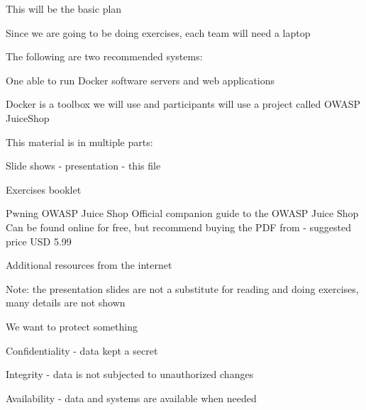 \documentclass[Screen16to9,17pt]{foils}
\begin{document}
\vskip 1cm
This will be the basic plan



Since we are going to be doing exercises, each team will need a laptop

The following are two recommended systems:
\begin{list2}
\item One able to run Docker software servers and web applications
\end{list2}

Docker is a toolbox we will use and participants will use a project called OWASP JuiceShop




\begin{list1}
\item This material is in multiple parts:
\begin{list2}
\item Slide shows - presentation - this file
\item Exercises booklet
\item Pwning OWASP Juice Shop Official companion guide to the OWASP Juice Shop
Can be found online for free, but recommend buying the PDF from  - suggested price USD 5.99

\end{list2}
\item Additional resources from the internet
\item Note: the presentation slides are not a substitute for reading and doing exercises, many details are not shown
\end{list1}



\begin{list1}
\item We want to protect something
\item Confidentiality - data kept a secret
\item Integrity - data is not subjected to unauthorized changes
\item Availability - data and systems are available when needed
\end{list1}
\end{document}
